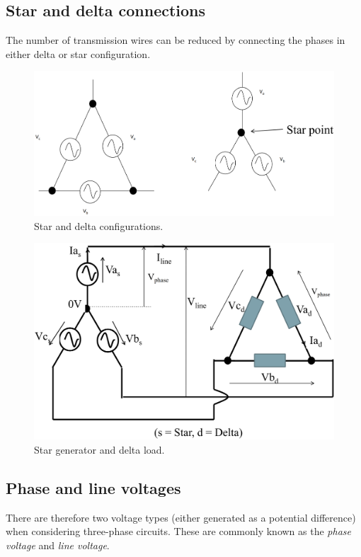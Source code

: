 \documentclass[class=report, crop=false, 12pt,a4paper]{standalone}
\begin{document}
\subsection{Star and delta connections}
The number of transmission wires can be reduced by connecting the phases in either delta or star configuration.
\begin{figure}[H]
	\centering
	\includegraphics[width = \textwidth]{../img/figure7.png}
	\caption{Star and delta configurations.}
\end{figure}
\begin{figure}[H]
	\centering
	\includegraphics[width = \textwidth]{../img/figure8.png}
	\caption{Star generator and delta load.}
\end{figure}
\subsection{Phase and line voltages}
There are therefore two voltage types (either generated as a potential difference) when considering three-phase circuits. These are commonly known as the \textit{phase voltage} and \textit{line voltage}.
\end{document}
